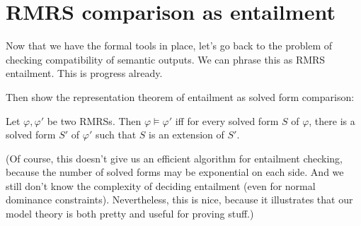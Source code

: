 \section{RMRS comparison as entailment}
\label{sec:entailment}

Now that we have the formal tools in place, let's go back to the
problem of checking compatibility of semantic outputs.  We can phrase
this as RMRS entailment.  This is progress already.

Then show the representation theorem of entailment as solved form
comparison:

\begin{thm}
  Let $\varphi, \varphi'$ be two RMRSs.  Then $\varphi \models
  \varphi'$ iff for every solved form $S$ of $\varphi$, there is a
  solved form $S'$ of $\varphi'$ such that $S$ is an extension of
  $S'$.
\end{thm}

(Of course, this doesn't give us an efficient algorithm for entailment
checking, because the number of solved forms may be exponential on
each side.  And we still don't know the complexity of deciding
entailment (even for normal dominance constraints).  Nevertheless,
this is nice, because it illustrates that our model theory is both
pretty and useful for proving stuff.)


